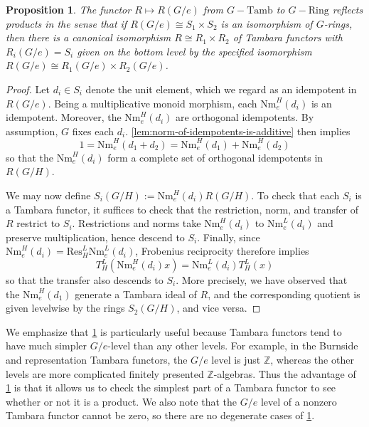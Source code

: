 \documentclass[11pt,dvipsnames]{amsart}
\newcommand{\Z}{\mathbb{Z}}
\newtheorem{proposition}[theorem]{Proposition}
\theoremstyle{BoldRemark}
\newcommand{\Tamb}{\mathrm{Tamb}}
\newcommand{\Ring}{\mathrm{Ring}}
\begin{document}
\begin{proposition}\label{prop:bottom-level-reflects-products}
	The functor $R \mapsto R(G/e)$ from $G {-} \Tamb$ to $G {-} \Ring$ reflects products in the sense that if $R(G/e) \cong S_1 \times S_2$ is an isomorphism of $G$-rings, then there is a canonical isomorphism $R \cong R_1 \times R_2$ of Tambara functors with $R_i(G/e) = S_i$ given on the bottom level by the specified isomorphism $R(G/e) \cong R_1(G/e) \times R_2(G/e)$.
\end{proposition}

\begin{proof}
	Let $d_i \in S_i$ denote the unit element, which we regard as an idempotent in $R(G/e)$. Being a multiplicative monoid morphism, each $\mathrm{Nm}_e^H(d_i)$ is an idempotent. Moreover, the $\mathrm{Nm}_e^H(d_i)$ are orthogonal idempotents. By assumption, $G$ fixes each $d_i$. \cref{lem:norm-of-idempotents-is-additive} then implies \[ 1 = \mathrm{Nm}_e^H(d_1+d_2) = \mathrm{Nm}_e^H(d_1)+\mathrm{Nm}_e^H(d_2) \] so that the $\mathrm{Nm}_e^H(d_i)$ form a complete set of orthogonal idempotents in $R(G/H)$.
	
	We may now define $S_i(G/H) := \mathrm{Nm}_e^H(d_i)R(G/H)$. To check that each $S_i$ is a Tambara functor, it suffices to check that the restriction, norm, and transfer of $R$ restrict to $S_i$. Restrictions and norms take $\mathrm{Nm}_e^H(d_i)$ to $\mathrm{Nm}_e^L(d_i)$ and preserve multiplication, hence descend to $S_i$. Finally, since $\mathrm{Nm}_e^H(d_i) = \mathrm{Res}_H^L \mathrm{Nm}_e^L(d_i)$, Frobenius reciprocity therefore implies \[ T_H^L(\mathrm{Nm}_e^H(d_i) x) = \mathrm{Nm}_e^L(d_i) T_H^L(x) \] so that the transfer also descends to $S_i$.	More precisely, we have observed that the $\mathrm{Nm}_e^H(d_1)$ generate a Tambara ideal of $R$, and the corresponding quotient is given levelwise by the rings $S_2(G/H)$, and vice versa.
\end{proof}

We emphasize that \cref{prop:bottom-level-reflects-products} is particularly useful because Tambara functors tend to have much simpler $G/e$-level than any other levels. For example, in the Burnside and representation Tambara functors, the $G/e$ level is just $\Z$, whereas the other levels are more complicated finitely presented $\Z$-algebras. Thus the advantage of \cref{prop:bottom-level-reflects-products} is that it allows us to check the simplest part of a Tambara functor to see whether or not it is a product. We also note that the $G/e$ level of a nonzero Tambara functor cannot be zero, so there are no degenerate cases of \cref{prop:bottom-level-reflects-products}.
\end{document}
